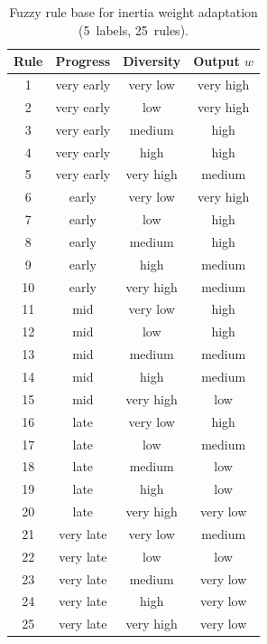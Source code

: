 \documentclass[conference]{IEEEtran}
\begin{document}
\begin{table}[htbp]
\caption{Fuzzy rule base for inertia weight adaptation (5~labels, 25~rules).}
\label{tab:rules5}
\centering
\begin{tabular}{@{}cccc@{}}
\toprule
Rule & Progress   & Diversity & Output $w$ \\ \midrule
1  & very early & very low  & very high \\
2  & very early & low       & very high \\
3  & very early & medium    & high      \\
4  & very early & high      & high      \\
5  & very early & very high & medium    \\ \midrule
6  & early      & very low  & very high \\
7  & early      & low       & high      \\
8  & early      & medium    & high      \\
9  & early      & high      & medium    \\
10 & early      & very high & medium    \\ \midrule
11 & mid        & very low  & high      \\
12 & mid        & low       & high      \\
13 & mid        & medium    & medium    \\
14 & mid        & high      & medium    \\
15 & mid        & very high & low       \\ \midrule
16 & late       & very low  & high      \\
17 & late       & low       & medium    \\
18 & late       & medium    & low       \\
19 & late       & high      & low       \\
20 & late       & very high & very low  \\ \midrule
21 & very late  & very low  & medium    \\
22 & very late  & low       & low       \\
23 & very late  & medium    & very low  \\
24 & very late  & high      & very low  \\
25 & very late  & very high & very low  \\ \bottomrule
\end{tabular}
\end{table}
\end{document}
